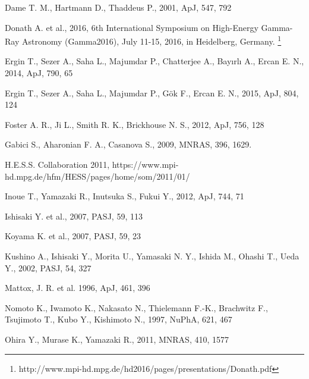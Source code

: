 \documentclass[useAMS,usenatbib]{mn2e}
\begin{document}
\begin{thebibliography}{99}
 Dame T. M., Hartmann D., Thaddeus P., 2001, ApJ, 547, 792

 Donath A. et al., 2016, 6th International Symposium on High-Energy Gamma-Ray Astronomy (Gamma2016), July 11-15, 2016, in Heidelberg, Germany. \footnote{http://www.mpi-hd.mpg.de/hd2016/pages/presentations/Donath.pdf} 

 Ergin T., Sezer A., Saha L., Majumdar P., Chatterjee A., Bay{\i}rl{\i} A., Ercan E. N., 2014, ApJ, 790, 65

 Ergin T., Sezer A., Saha L., Majumdar P., G\"{o}k F., Ercan E. N., 2015, ApJ, 804, 124

 Foster A. R., Ji L., Smith R. K., Brickhouse N. S., 2012, ApJ, 756, 128

 Gabici S., Aharonian F. A., Casanova S., 2009, MNRAS, 396, 1629.

 H.E.S.S. Collaboration 2011, https://www.mpi-hd.mpg.de/hfm/HESS/pages/home/som/2011/01/

Inoue T., Yamazaki R., Inutsuka S., Fukui Y., 2012, ApJ, 744, 71

 Ishisaki Y. et al., 2007, PASJ, 59, 113

 Koyama K. et al., 2007, PASJ, 59, 23

Kushino A., Ishisaki Y., Morita U., Yamasaki N. Y., Ishida M., Ohashi T., Ueda Y., 2002, PASJ, 54, 327

 Mattox, J. R. et al. 1996, ApJ, 461, 396

 Nomoto K., Iwamoto K., Nakasato N., Thielemann F.-K., Brachwitz F., Tsujimoto T., Kubo Y., Kishimoto N., 1997, NuPhA, 621, 467

Ohira Y., Murase K., Yamazaki R., 2011, MNRAS, 410, 1577


\end{thebibliography}
\end{document}
